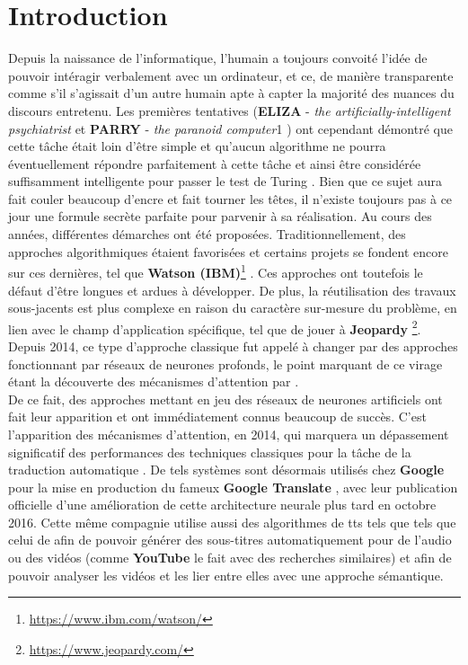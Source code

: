 \section{Introduction}

Depuis la naissance de l'informatique, l'humain a toujours convoité l'idée de pouvoir intéragir verbalement avec un ordinateur, et ce, de manière transparente comme s'il s'agissait d'un autre humain apte à capter la majorité des nuances du discours entretenu. Les premières tentatives (\textbf{ELIZA} - \textit{the artificially-intelligent psychiatrist} \cite{elizaWeizenbaum} et   \textbf{PARRY} - \textit{the paranoid computer}1 \cite{parryCerf}) ont cependant démontré que cette tâche était loin d'être simple et qu'aucun algorithme ne pourra éventuellement répondre parfaitement à cette tâche et ainsi être considérée suffisamment intelligente pour passer le test de Turing \cite{turingTest}. Bien que ce sujet aura fait couler beaucoup d'encre et fait tourner les têtes, il n'existe toujours pas à ce jour une formule secrète parfaite pour parvenir à sa réalisation. Au cours des années, différentes démarches ont été proposées. Traditionnellement, des approches algorithmiques étaient favorisées et certains projets se fondent encore sur ces dernières, tel que \textbf{Watson (IBM)}\footnote{\url{https://www.ibm.com/watson/}} \cite{ibmWatson}. Ces approches ont toutefois le défaut d'être longues et ardues à développer. De plus, la réutilisation des travaux sous-jacents est plus complexe en raison du caractère sur-mesure du problème, en lien avec le champ d'application spécifique, tel que de jouer à \textbf{Jeopardy} \footnote{\url{https://www.jeopardy.com/}}. Depuis 2014, ce type d'approche classique fut appelé à changer par des approches fonctionnant par réseaux de neurones profonds, le point marquant de ce virage étant la découverte des mécanismes d'attention par \cite{attentionMechanism}. \\

De ce fait, des approches mettant en jeu des réseaux de neurones artificiels ont fait leur apparition et ont immédiatement connus beaucoup de succès. C'est l'apparition des mécanismes d'attention, en 2014, qui marquera un dépassement significatif des performances des techniques classiques pour la tâche de la traduction automatique \cite{attentionMechanism}. De tels systèmes sont désormais utilisés chez \textbf{Google} pour la mise en production du fameux \textbf{Google Translate} \cite{googleTranslate}, avec leur publication officielle d'une amélioration de cette architecture neurale plus tard en octobre 2016. Cette même compagnie utilise aussi des algorithmes de \gls{tts} tels que tels que celui de \cite{acousticModeling} afin de pouvoir générer des sous-titres automatiquement pour de l'audio ou des vidéos (comme \textbf{YouTube} le fait avec des recherches similaires) et afin de pouvoir analyser les vidéos et les lier entre elles avec une approche sémantique. \\

